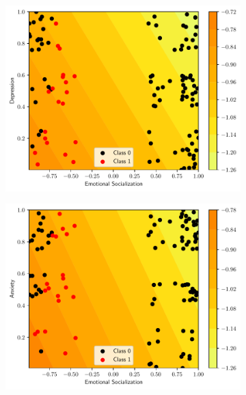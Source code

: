 \begin{figure}
  \begin{subfigure}[b]{0.32\textwidth}
    \centering
    \includegraphics[width=\textwidth]{figs/svm-linear-contour-2-3.pdf}
    \caption{}
  \end{subfigure}
  \begin{subfigure}[b]{0.32\textwidth}
    \centering
    \includegraphics[width=\textwidth]{figs/svm-linear-contour-2-4.pdf}
    \caption{}
  \end{subfigure}
  \begin{subfigure}[b]{0.32\textwidth}
    \centering

\end{subfigure}
\end{figure}
